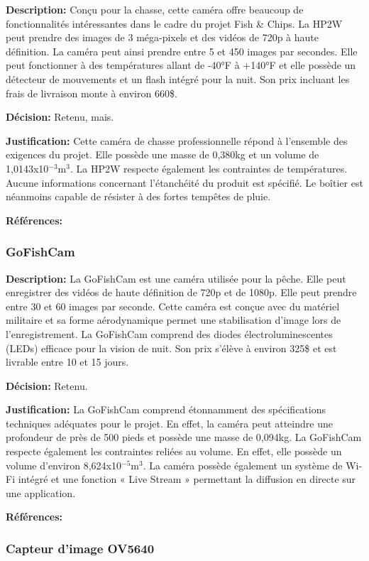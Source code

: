 \textbf{Description:} Conçu pour la chasse, cette caméra offre beaucoup de fonctionnalités intéressantes dans le cadre du projet Fish \& Chips. La HP2W peut prendre des images de 3 méga-pixels et des vidéos de 720p à haute définition. La caméra peut ainsi prendre entre 5 et 450 images par secondes. Elle peut fonctionner à des températures allant de -40°F à +140°F et elle possède un détecteur de mouvements et un flash intégré pour la nuit. Son prix incluant les frais de livraison monte à environ 660\$.

\textbf{Décision:} Retenu, mais.

\textbf{Justification:} Cette caméra de chasse professionnelle répond à l'ensemble des exigences du projet. Elle possède une masse de 0,380kg et un volume de 1,0143x10$^{-3}$m$^3$. La HP2W respecte également les contraintes de températures. Aucune informations concernant l'étanchéité du produit est spécifié. Le boîtier est néanmoins capable de résister à des fortes tempêtes de pluie.

\textbf{Références:} \cite{HP2W}


\subsubsection{GoFishCam}

\textbf{Description:} La GoFishCam est une caméra utilisée pour la pêche. Elle peut enregistrer des vidéos de haute définition de 720p et de 1080p. Elle peut prendre entre 30 et 60 images par seconde. Cette caméra est conçue avec du matériel militaire et sa forme aérodynamique permet une stabilisation d'image lors de l'enregistrement. La GoFishCam comprend des diodes électroluminescentes (LEDs) efficace pour la vision de nuit. Son prix s'élève à environ 325\$ et est livrable entre 10 et 15 jours.

\textbf{Décision:} Retenu.

\textbf{Justification:} La GoFishCam comprend étonnamment des spécifications techniques adéquates pour le projet. En effet, la caméra peut atteindre une profondeur de près de 500 pieds et possède une masse de 0,094kg. La GoFishCam respecte également les contraintes reliées au volume. En effet, elle possède un volume d'environ 8,624x10$^{-5}$m$^3$. La caméra possède également un système de Wi-Fi intégré et une fonction « Live Stream » permettant la diffusion en directe sur une application.

\textbf{Références:} \cite{GoFishCam} 


\subsubsection{Capteur d'image OV5640}
\label{subsubsection:camera_custom}

